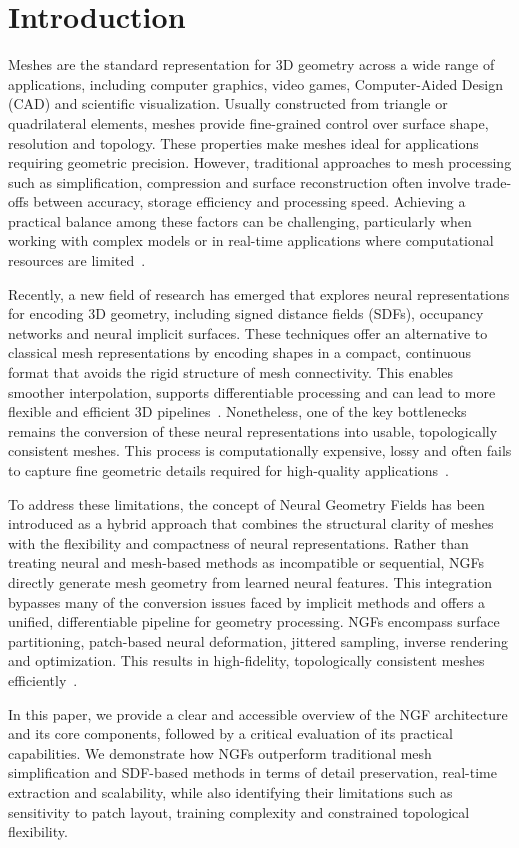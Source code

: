 \section{Introduction}\label{sec:introduction}

Meshes are the standard representation for 3D geometry across a wide range of applications, including computer graphics, video games, Computer-Aided Design (CAD) and scientific visualization.  
Usually constructed from triangle or quadrilateral elements, meshes provide fine-grained control over surface shape, resolution and topology.  
These properties make meshes ideal for applications requiring geometric precision.
However, traditional approaches to mesh processing such as simplification, compression and surface reconstruction often involve trade-offs between accuracy, storage efficiency and processing speed.  
Achieving a practical balance among these factors can be challenging, particularly when working with complex models or in real-time applications where computational resources are limited~\cite{maglo2015}.  

Recently, a new field of research has emerged that explores neural representations for encoding 3D geometry, including signed distance fields (SDFs), occupancy networks and neural implicit surfaces.  
These techniques offer an alternative to classical mesh representations by encoding shapes in a compact, continuous format that avoids the rigid structure of mesh connectivity.  
This enables smoother interpolation, supports differentiable processing and can lead to more flexible and efficient 3D pipelines~\cite{park2019}.  
Nonetheless, one of the key bottlenecks remains the conversion of these neural representations into usable, topologically consistent meshes.  
This process is computationally expensive, lossy and often fails to capture fine geometric details required for high-quality applications~\cite{sivaram2024}.  

To address these limitations, the concept of Neural Geometry Fields has been introduced as a hybrid approach that combines the structural clarity of meshes with the flexibility and compactness of neural representations.  
Rather than treating neural and mesh-based methods as incompatible or sequential, NGFs directly generate mesh geometry from learned neural features.  
This integration bypasses many of the conversion issues faced by implicit methods and offers a unified, differentiable pipeline for geometry processing.  
NGFs encompass surface partitioning, patch-based neural deformation, jittered sampling, inverse rendering and optimization.  
This results in high-fidelity, topologically consistent meshes efficiently~\cite{sivaram2024}.  

In this paper, we provide a clear and accessible overview of the NGF architecture and its core components, followed by a critical evaluation of its practical capabilities.  
We demonstrate how NGFs outperform traditional mesh simplification and SDF-based methods in terms of detail preservation, real-time extraction and scalability, while also identifying their limitations such as sensitivity to patch layout, training complexity and constrained topological flexibility.  
